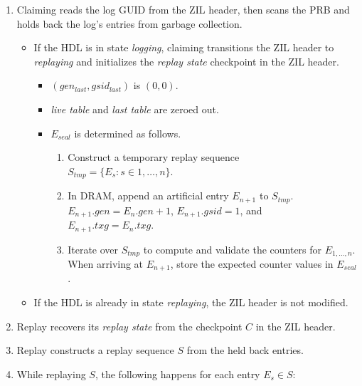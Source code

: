 \documentclass[12pt,a4paper,twoside]{book}
\begin{document}
\begin{enumerate}[noitemsep,beginpenalty=100000,midpenalty=100000]
    \item \label{ccReplay:claimscan} Claiming reads the log GUID from the ZIL header, then scans the PRB and holds back the log's entries from garbage collection.
    \begin{itemize}[noitemsep,beginpenalty=100000,midpenalty=100000]
        \item \label{ccReplay:transitionToReplaying} If the HDL is in state \textit{logging}, claiming transitions the ZIL header to \textit{replaying} and initializes the \textit{replay state} checkpoint in the ZIL header.
            \begin{itemize}
                \item $(gen_{last}, gsid_{last})$ is $(0, 0)$.
                \item \textit{live table} and \textit{last table} are zeroed out.
                \item $E_{seal}$ is determined as follows.
                \begin{enumerate}
                    \item Construct a temporary replay sequence \\ \mbox{$S_{tmp} = \{E_s : s \in 1, \dots, n\}$}.
                    \item In DRAM, append an artificial entry $E_{n+1}$ to $S_{tmp}$. \\
                        \mbox{$E_{n+1}.gen = E_{n}.gen + 1$}, \mbox{$E_{n+1}.gsid = 1$}, and \\
                        \mbox{$E_{n+1}.txg = E_{n}.txg$}.
                    \item Iterate over $S_{tmp}$ to compute and validate the counters for $E_{1,\dots,n}$.
                        When arriving at $E_{n+1}$, store the expected counter values in $E_{seal}$.
                \end{enumerate}
            \end{itemize}
        \item If the HDL is already in state \textit{replaying}, the ZIL header is not modified.
    \end{itemize}
    \item Replay recovers its \textit{replay state} from the checkpoint $C$ in the ZIL header.
    \item \label{ccReplay:construct_sequence} Replay constructs a replay sequence $S$ from the held back entries.
    \item While replaying $S$, the following happens for each entry $E_s \in S$:

\end{enumerate}
\end{document}
